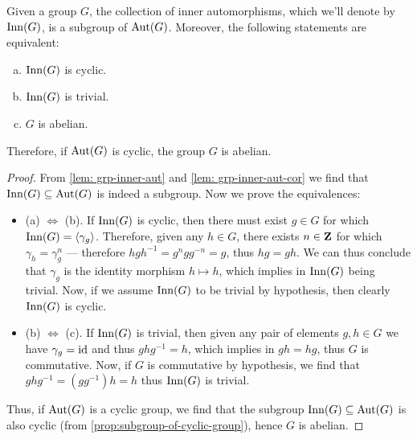 \begin{lemma}
    \label{lem:inner-aut-subgroup}
    Given a group \(G\), the collection of inner automorphisms, which we'll denote
    by \(\operatorname{Inn}(G)\), is a subgroup of \(\operatorname{Aut}(G)\). Moreover, the following statements
    are equivalent:
    \begin{enumerate}[(a)]\setlength\itemsep{0em}
        \item \(\operatorname{Inn}(G)\) is cyclic.
        \item \(\operatorname{Inn}(G)\) is trivial.
        \item \(G\) is abelian.
    \end{enumerate}
    Therefore, if \(\operatorname{Aut}(G)\) is cyclic, the group \(G\) is abelian.
\end{lemma}

\begin{proof}
    From \cref{lem: grp-inner-aut} and \cref{lem: grp-inner-aut-cor} we find that
    \(\operatorname{Inn}(G) \subseteq \operatorname{Aut}(G)\) is indeed a subgroup. Now we prove the
    equivalences:
    \begin{itemize}\setlength\itemsep{0em}
        \item (a) \(\Leftrightarrow\) (b). If \(\operatorname{Inn}(G)\) is cyclic, then there must
              exist \(g \in G\) for which \(\operatorname{Inn}(G) = \langle \gamma_g \rangle\). Therefore,
              given any \(h \in G\), there exists \(n \in \mathbf{Z}\) for which \(\gamma_h =
              \gamma_g^n\) --- therefore \(h g h^{-1} = g^n g g^{-n} = g\), thus \(h g = g
              h\). We can thus conclude that \(\gamma_g\) is the identity morphism \(h \mapsto
              h\), which implies in \(\operatorname{Inn}(G)\) being trivial. Now, if we assume \(\operatorname{Inn}(G)\)
              to be trivial by hypothesis, then clearly \(\operatorname{Inn}(G)\) is cyclic.

        \item (b) \(\Leftrightarrow\) (c). If \(\operatorname{Inn}(G)\) is trivial, then given any
              pair of elements \(g, h \in G\) we have \(\gamma_g = \operatorname{id}\) and thus \(g h g^{-1}
              = h\), which implies in \(g h = h g\), thus \(G\) is commutative. Now, if \(G\)
              is commutative by hypothesis, we find that \(g h g^{-1} = (g g^{-1}) h = h\)
              thus \(\operatorname{Inn}(G)\) is trivial.
    \end{itemize}
    Thus, if \(\operatorname{Aut}(G)\) is a cyclic group, we find that the subgroup \(\operatorname{Inn}(G)
    \subseteq \operatorname{Aut}(G)\) is also cyclic (from \cref{prop:subgroup-of-cyclic-group}),
    hence \(G\) is abelian.
\end{proof}

